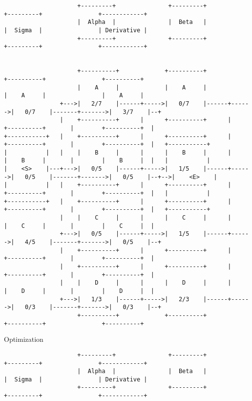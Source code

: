 \documentclass{article}
\begin{document}
{
\begin{verbatim}
                     +---------+               +---------+              +---------+                +------------+
                     |  Alpha  |               |  Beta   |              |  Sigma  |                | Derivative |
                     +---------+               +---------+              +---------+                +------------+


                     +----------+             +----------+              +----------+                +----------+
                     |    A     |             |    A     |              |    A     |                |    A     |
                +--->|   2/7    |------+----->|   0/7    |------+------>|   0/7    |-------+------->|   3/7    |--+
                |    +----------+      |      +----------+      |       +----------+       |        +----------+  |
+-----------+   |    +----------+      |      +----------+      |       +----------+       |        +----------+  |   +-----------+
|           |   |    |    B     |      |      |    B     |      |       |    B     |       |        |    B     |  |   |           |
|    <S>    |---+--->|   0/5    |------+----->|   1/5    |------+------>|   0/5    |-------+------->|   0/5    |--+-->|    <E>    |
|           |   |    +----------+      |      +----------+      |       +----------+       |        +----------+  |   |           |
+-----------+   |    +----------+      |      +----------+      |       +----------+       |        +----------+  |   +-----------+
                |    |    C     |      |      |    C     |      |       |    C     |       |        |    C     |  |
                +--->|   0/5    |------+----->|   1/5    |------+------>|   4/5    |-------+------->|   0/5    |--+
                |    +----------+      |      +----------+      |       +----------+       |        +----------+  |
                |    +----------+      |      +----------+      |       +----------+       |        +----------+  |
                |    |    D     |      |      |    D     |      |       |    D     |       |        |    D     |  |
                +--->|   1/3    |------+----->|   2/3    |------+------>|   0/3    |-------+------->|   0/3    |--+
                     +----------+             +----------+              +----------+                +----------+
\end{verbatim}
Optimization 
\begin{verbatim}
                     +---------+               +---------+              +---------+                +------------+
                     |  Alpha  |               |  Beta   |              |  Sigma  |                | Derivative |
                     +---------+               +---------+              +---------+                +------------+


\end{verbatim}}
\end{document}
